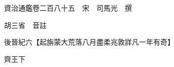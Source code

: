 










 


 
 


 

  
  
  
  
  





  
  
  
  
  
 
  

  

  
  
  



  

 
 

  
   




  

  
  


  　　資治通鑑卷二百八十五　宋　司馬光　撰

　　胡三省　音註

　　後晉紀六【起旃蒙大荒落八月盡柔兆敦牂凡一年有奇】

　　齊王下

